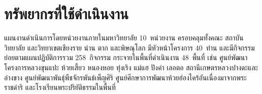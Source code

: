 \section{ทรัพยากรที่ใช้ดำเนินงาน}
แผนงานดำเนินการโดยหน่วยงานภายในมหาวิทยาลัย 10~หน่วยงาน ครอบคลุมทั้งคณะ สถาบัน วิทยาลัย
และวิทยาเขตเชียงราย น่าน ตาก และพิษณุโลก มีหัวหน้าโครงการ 40~ท่าน
และมีกิจกรรมย่อยตามแผนปฏิบัติการรวม 258~กิจกรรม กระจายในพื้นที่ดำเนินงาน 48~พื้นที่
เช่น ศูนย์พัฒนาโครงการหลวงขุนแปะ ห้วยเสี้ยว หนองหอย ทุ่งเริง แม่แฮ ปังค่า เลอตอ
สถานีเกษตรหลวงปางดะและอ่างขาง ศูนย์พัฒนาพันธุ์พืชจักรพันธ์เพ็ญศิริ
ศูนย์ศึกษาการพัฒนาห้วยฮ่องไคร้อันเนื่องมาจากพระราชดำริ และโรงเรียนพระปริยัติธรรมในพื้นที่
